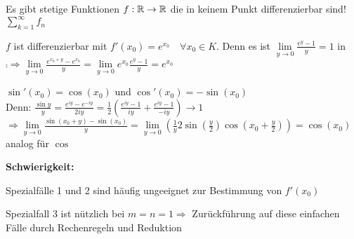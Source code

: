 	\begin{bemerkung}
		Es gibt stetige Funktionen $f:\mathbb{R}\to \mathbb{R}$ die in keinem Punkt differenzierbar sind! \\
		$\sum\limits_{k=1}^{\infty} f_n$
	\end{bemerkung}

	\begin{beispiel}[$f:K\to K$ mit $f(x)=e^x$]
		$f$ ist differenzierbar mit $f'(x_0)=e^{x_0}\quad\forall x_0\in K$. Denn es ist $\lim\limits_{y\to 0} 
		\frac{e^y-1}{y}=1$ in $\comp \Rightarrow \lim\limits_{y\to 0} \frac{e^{x_0+y}-e^{x_0}}{y}=
		\lim\limits_{y\to 0} e^{x_0}\frac{e^y-1}{y}=e^{x_0}$
	\end{beispiel}

	\begin{beispiel}
		$\sin'(x_0)=\cos(x_0)$ und $\cos'(x_0)=-\sin(x_0)$ \\
		Denn: $\frac{\sin y}{y}=\frac{e^{iy}-e^{-iy}}{2iy}=\frac{1}{2}\left( \frac{e^{iy}-1}{iy}+
		\frac{e^{iy}-1}{-iy}\right) \to 1$ \\
		$\Rightarrow \lim\limits_{y\to 0} \frac{\sin(x_0+y)-\sin(x_0)}{y}=\lim\limits_{y\to 0} \left(
		 \frac{1}{y}2\sin(\frac{y}{2})\cos(x_0+\frac{y}{2}) \right) =\cos(x_0)$ \\
		 analog für $\cos$
	\end{beispiel}

	\textbf{Schwierigkeit:}
	\begin{compactitem}
		\item Spezialfälle 1 und 2 sind häufig ungeeignet zur Bestimmung von $f'(x_0)$
		\item Spezialfall 3 ist nützlich bei $m=n=1 \Rightarrow$ Zurückführung auf diese einfachen Fälle 
		durch Rechenregeln und Reduktion
	\end{compactitem}

